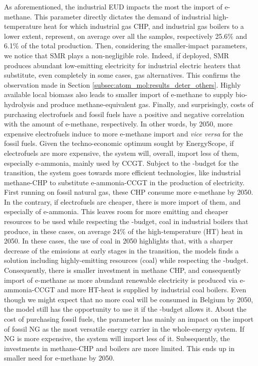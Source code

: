As aforementioned, the industrial \gls{EUD} impacts the most the import of e-methane. This parameter directly dictates the demand of industrial high-temperature heat for which industrial gas \gls{CHP}, and industrial gas boilers to a lower extent, represent, on average over all the samples, respectively 25.6\% and 6.1\% of the total production. Then, considering the smaller-impact parameters, we notice that \gls{SMR} plays a non-negligible role. Indeed, if deployed, \gls{SMR} produces abundant low-emitting electricity for industrial electric heaters that substitute, even completely in some cases, gas alternatives. This confirms the observation made in Section \ref{subsec:atom_mol:results_deter_others}. Highly available local biomass also leads to smaller import of e-methane to supply bio-hydrolysis and produce methane-equivalent gas. Finally, and surprisingly, costs of purchasing electrofuels and fossil fuels have a positive and negative correlation with the amount of e-methane, respectively. In other words, by 2050, more expensive electrofuels induce to more e-methane import and \textit{vice versa} for the fossil fuels. Given the techno-economic optimum sought by EnergyScope, if electrofuels are more expensive, the system will, overall, import less of them, especially e-ammonia, mainly used by \gls{CCGT}. Subject to the -budget for the transition, the system goes towards more efficient technologies, like industrial methane-\gls{CHP} to substitute e-ammonia-\gls{CCGT} in the production of electricity. First running on fossil natural gas, these \gls{CHP} consume more e-methane by 2050. In the contrary, if electrofuels are cheaper, there is more import of them, and especially of e-ammonia. This leaves room for more emitting and cheaper resources to be used while respecting the -budget, \ie coal in industrial boilers that produce, in these cases, on average 24\% of the high-temperature (HT) heat in 2050. In these cases, the use of coal in 2050 highlights that, with a sharper decrease of the emissions at early stages in the transition, the models finds a solution including highly-emitting resources (\eg coal) while respecting the -budget. Consequently, there is smaller investment in methane \gls{CHP}, and consequently import of e-methane as more abundant renewable electricity is produced via e-ammonia-\gls{CCGT} and more HT-heat is supplied by industrial coal boilers. Even though we might expect that no more coal will be consumed in Belgium by 2050, the model still has the opportunity to use it if the -budget allows it. About the cost of purchasing fossil fuels, the parameter has mainly an impact on the import of fossil \gls{NG} as the most versatile energy carrier in the whole-energy system. If \gls{NG} is more expensive, the system will import less of it. Subsequently, the investments in methane-\gls{CHP} and boilers are more limited. This ends up in smaller need for e-methane by 2050.

